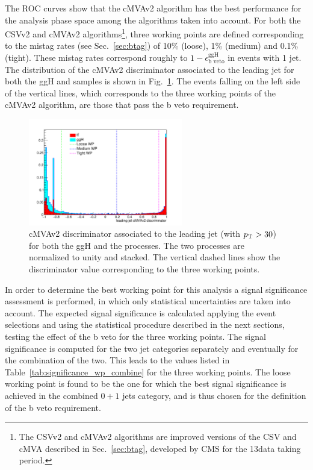 The ROC curves show that the cMVAv2 algorithm has the best performance for the analysis phase space among the algorithms taken into account. For both the CSVv2 and cMVAv2 algorithms\footnote{The CSVv2 and cMVAv2 algorithms are improved versions of the CSV and cMVA described in Sec.~\ref{sec:btag}, developed by CMS for the 13\TeV data taking period.}, three working points are defined corresponding to the mistag rates (see Sec.~\ref{sec:btag}) of 10\% (loose), 1\% (medium) and 0.1\% (tight). These mistag rates correspond roughly to $1-\epsilon_\text{b veto}^\text{ggH}$ in events with 1 jet. The distribution of the cMVAv2 discriminator associated to the leading jet for both the ggH and \ttbar samples is shown in Fig.~\ref{fig:discriminator}. The events falling on the left side of the vertical lines, which corresponds to the three working points of the cMVAv2 algorithm, are those that pass the b veto requirement.

\begin{figure}[htb]
\centering
\includegraphics[width=0.6\textwidth]{images/13TeV/cmva_WP.pdf}
\caption{cMVAv2 discriminator associated to the leading jet (with $p_\mathrm{T} > 30$\GeV) for both the ggH and the \ttbar processes. The two processes are normalized to unity and stacked. The vertical dashed lines show the discriminator value corresponding to the three working points.}\label{fig:discriminator}
\end{figure}

In order to determine the best working point for this analysis a signal significance assessment is performed, in which only statistical uncertainties are taken into account. The expected signal significance is calculated applying the event selections and using the statistical procedure described in the next sections, testing the effect of the b veto for the three working points.
The signal significance is computed for the two jet categories separately and eventually for the combination of the two. This leads to the values listed in Table~\ref{tab:significance_wp_combine} for the three working points. The loose working point is found to be the one for which the best signal significance is achieved in the combined $0+1$ jets category, and is thus chosen for the definition of the b veto requirement.

